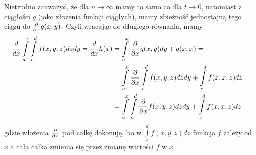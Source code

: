 \documentclass{article}[13pt]
\begin{document}
Nietrudno zauważyć, że dla $n\to \infty$ mamy to samo co dla $t\to0$, natomiast z ciągłości $g$ (jako złożenia funkcji ciągłych), mamy zbieżność jednostajną tego ciągu do ${\partial\over\partial x}g(x, y)$. Czyli wracając do długiego równania, mamy
\begin{align*}
    {d\over dx}\int\limits_a^x\int\limits_c^df(x, y, z)dzdy={d\over dx}h(x)&=\int\limits_a^x{\partial\over\partial x}g(x, y)dy+g(x, x)=\\
    &=\int\limits_a^x{\partial\over\partial x}\int\limits_c^df(x, y, z)dzdy+\int\limits_c^df(x, x, z)dz=\\
    &=\int\limits_a^x\int\limits_c^d{\partial\over\partial x}f(x, y, z)dzdy+\int\limits_c^df(x, x, z)dz
\end{align*}
gdzie włożenia ${\partial\over\partial x}$ pod całkę dokonuję, bo w $\int\limits_c^df(x, y, z)dz$ funkcja $f$ zależy od $x$ a cała całka zmienia się przez zmianę wartości $f$ w $x$.
\end{document}
